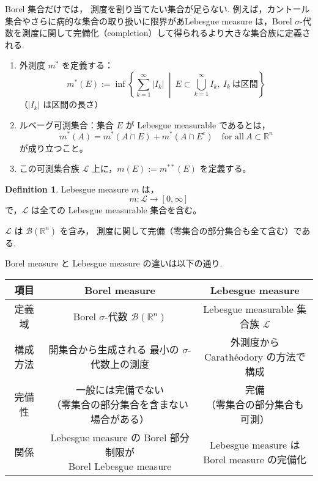 \documentclass[dvipdfmx,a4paper,11pt]{article} %
\theoremstyle{definition}
\newtheorem{defn}[thm]{Definition}
\theoremstyle{remark}
\numberwithin{equation}{section}
\begin{document}
Borel 集合だけでは， 測度を割り当てたい集合が足らない. 例えば，カントール集合やさらに病的な集合の取り扱いに限界があLebesgue measure は，Borel \(\sigma\)-代数を測度に関して完備化（completion）して得られるより大きな集合族に定義される.

\begin{enumerate}
    \item 外測度 \(m^*\) を定義する：
    \[
    m^*(E) := \inf \left\{ \sum_{k=1}^\infty |I_k| \ \middle| \ E \subset \bigcup_{k=1}^\infty I_k, \ I_k \ \text{は区間} \right\}
    \]
    （\(|I_k|\) は区間の長さ）
    \item ルベーグ可測集合：集合 \(E\) が Lebesgue measurable であるとは，
    \[
    m^*(A) = m^*(A \cap E) + m^*(A \cap E^c) \quad \text{for all} \ A \subset \mathbb{R}^n
    \]
    が成り立つこと。
    \item この可測集合族 \(\mathcal{L}\) 上に，\(m(E) := m^{**}(E)\) を定義する。
\end{enumerate}
\begin{tcolorbox}[mybox]
\begin{defn}
Lebesgue measure \(m\) は，
\[
m : \mathcal{L} \to [0, \infty]
\]
で，\(\mathcal{L}\) は全ての Lebesgue measurable 集合を含む。
\end{defn}
\end{tcolorbox}
\(\mathcal{L}\) は \(\mathcal{B}(\mathbb{R}^n)\) を含み， 測度に関して完備（零集合の部分集合も全て含む）である.

Borel measure と Lebesgue measure の違いは以下の通り. 

\begin{center}
\renewcommand{\arraystretch}{1.3} %
\begin{tabular}{|c|c|c|}
\hline
項目 & Borel measure & Lebesgue measure \\ \hline
定義域 &
\shortstack[c]{Borel $\sigma$-代数\\$\mathcal{B}(\mathbb{R}^n)$} &
\shortstack[c]{Lebesgue measurable\\集合族 $\mathcal{L}$} \\ \hline
構成方法 &
\shortstack[c]{開集合から生成される\\最小の $\sigma$-代数上の測度} &
\shortstack[c]{外測度から\\Carathéodory の方法で構成} \\ \hline
完備性 &
\shortstack[c]{一般には完備でない\\（零集合の部分集合を含まない場合がある）} &
\shortstack[c]{完備\\（零集合の部分集合も可測）} \\ \hline
関係 &
\shortstack[c]{Lebesgue measure の Borel 部分制限が\\Borel Lebesgue measure} &
\shortstack[c]{Lebesgue measure は\\Borel measure の完備化} \\ \hline
\end{tabular}
\end{center}
\end{document}
